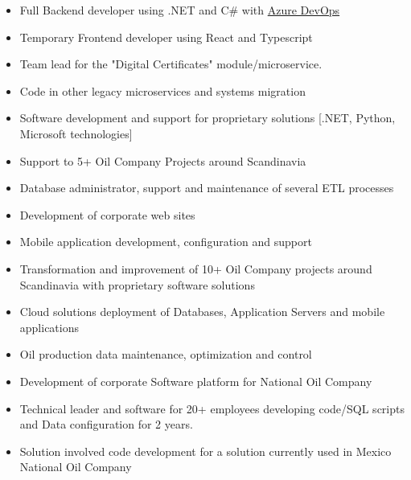 \begin{itemize}
    \item Full Backend developer using .NET and C# with \href{dev.azure.com}{Azure DevOps} 
    \item Temporary Frontend developer using React and Typescript
    \item Team lead for the "Digital Certificates"  module/microservice.
    \item Code in other legacy microservices and systems migration
\end{itemize}

\divider

\begin{itemize}
\item Software development and support for proprietary solutions [.NET, Python, Microsoft technologies]
\item Support to 5+ Oil Company Projects around Scandinavia
\item Database administrator, support and maintenance of several ETL processes
\item Development of corporate web sites
\item Mobile application development, configuration and support
\end{itemize}

\divider

\begin{itemize}
\item Transformation and improvement of 10+ Oil Company projects around Scandinavia with proprietary software solutions
\item Cloud solutions deployment of Databases, Application Servers and mobile applications
\item Oil production data maintenance, optimization and control
\end{itemize}

\divider

\begin{itemize}
    \item Development of corporate Software platform for National Oil Company
    \item Technical leader and software for 20+ employees developing code/SQL scripts and Data configuration for 2 years.
    \item Solution involved code development for a solution currently used in Mexico National Oil Company
    
\end{itemize}
\divider

